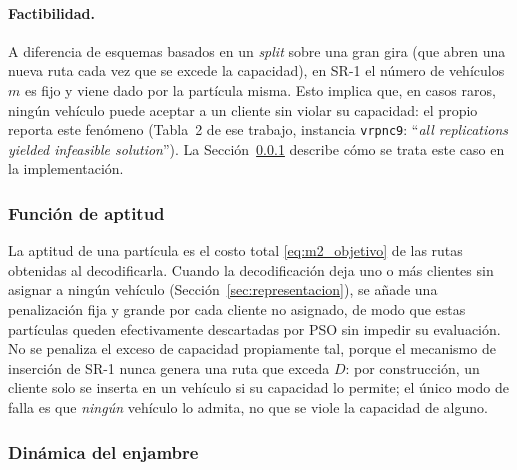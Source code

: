 \paragraph{Factibilidad.} A diferencia de esquemas basados en un \textit{split} sobre una
gran gira (que abren una nueva ruta cada vez que se excede la capacidad), en SR-1 el
número de vehículos $m$ es fijo y viene dado por la partícula misma. Esto implica que,
en casos raros, ningún vehículo puede aceptar a un cliente sin violar su capacidad: el
propio \textcite{ai2009particle} reporta este fenómeno (Tabla~2 de ese trabajo, instancia
\texttt{vrpnc9}: ``\textit{all replications yielded infeasible solution}''). La
Sección~\ref{sec:funcion-aptitud} describe cómo se trata este caso en la implementación.

\subsubsection{Función de aptitud}
\label{sec:funcion-aptitud}

La aptitud de una partícula es el costo total \eqref{eq:m2_objetivo} de las rutas
obtenidas al decodificarla. Cuando la decodificación deja uno o más clientes sin asignar
a ningún vehículo (Sección~\ref{sec:representacion}), se añade una penalización fija y
grande por cada cliente no asignado, de modo que estas partículas queden efectivamente
descartadas por PSO sin impedir su evaluación. No se penaliza el exceso de capacidad
propiamente tal, porque el mecanismo de inserción de SR-1 nunca genera una ruta que
exceda $D$: por construcción, un cliente solo se inserta en un vehículo si su capacidad
lo permite; el único modo de falla es que \emph{ningún} vehículo lo admita, no que se
viole la capacidad de alguno.

\subsubsection{Dinámica del enjambre}

